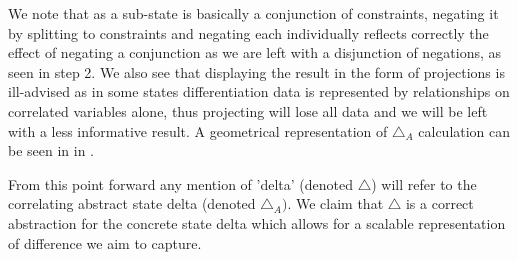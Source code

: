 We note that as a sub-state is basically a conjunction of constraints, negating it by splitting to constraints and negating each individually reflects correctly the effect of negating a conjunction as we are left with a disjunction of negations, as seen in step 2.
We also see that displaying the result in the form of projections is ill-advised as in some states differentiation data is represented by relationships on correlated variables alone, thus projecting will lose all data and we will be left with a less informative result. A geometrical representation of $\triangle_{A}$ calculation can be seen in  in .

%

From this point forward any mention of 'delta' (denoted $\triangle$) will refer to the correlating abstract state delta (denoted $\triangle_{A})$. We claim that $\triangle$ is a correct abstraction for the concrete state delta which allows for a scalable representation of difference we aim to capture.
